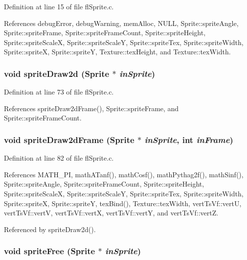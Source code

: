 Definition at line 15 of file fl\-Sprite.c.

References debug\-Error, debug\-Warning, mem\-Alloc, NULL, Sprite::sprite\-Angle, Sprite::sprite\-Frame, Sprite::sprite\-Frame\-Count, Sprite::sprite\-Height, Sprite::sprite\-Scale\-X, Sprite::sprite\-Scale\-Y, Sprite::sprite\-Tex, Sprite::sprite\-Width, Sprite::sprite\-X, Sprite::sprite\-Y, Texture::tex\-Height, and Texture::tex\-Width.
\subsubsection{\setlength{\rightskip}{0pt plus 5cm}void sprite\-Draw2d ({\bf Sprite} $\ast$ {\em in\-Sprite})}\label{flSprite_8c_ba260da216330964da593c7a6ad9ab51}




Definition at line 73 of file fl\-Sprite.c.

References sprite\-Draw2d\-Frame(), Sprite::sprite\-Frame, and Sprite::sprite\-Frame\-Count.
\subsubsection{\setlength{\rightskip}{0pt plus 5cm}void sprite\-Draw2d\-Frame ({\bf Sprite} $\ast$ {\em in\-Sprite}, int {\em in\-Frame})}\label{flSprite_8c_c34d1e4b449c227734bfa340f470d4f1}




Definition at line 82 of file fl\-Sprite.c.

References MATH\_\-PI, math\-ATanf(), math\-Cosf(), math\-Pythag2f(), math\-Sinf(), Sprite::sprite\-Angle, Sprite::sprite\-Frame\-Count, Sprite::sprite\-Height, Sprite::sprite\-Scale\-X, Sprite::sprite\-Scale\-Y, Sprite::sprite\-Tex, Sprite::sprite\-Width, Sprite::sprite\-X, Sprite::sprite\-Y, tex\-Bind(), Texture::tex\-Width, vert\-Ts\-Vf::vert\-U, vert\-Ts\-Vf::vert\-V, vert\-Ts\-Vf::vert\-X, vert\-Ts\-Vf::vert\-Y, and vert\-Ts\-Vf::vert\-Z.

Referenced by sprite\-Draw2d().
\subsubsection{\setlength{\rightskip}{0pt plus 5cm}void sprite\-Free ({\bf Sprite} $\ast$ {\em in\-Sprite})}\label{flSprite_8c_ba10606746e61c0fb83f4d128ebe1c57}




